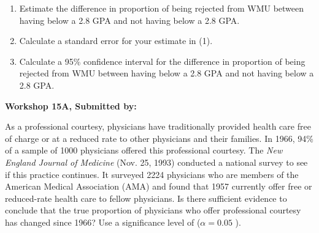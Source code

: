 \documentclass[11pt, chapterprefix=true]{scrbook}\usepackage[]{graphicx}\usepackage[]{color}
\begin{document}
\begin{exercises}
\begin{exercise}
\begin{enumerate}
  \item Estimate the difference in proportion of being rejected from WMU between having below a 2.8 GPA and not having below a 2.8 GPA.
  \item Calculate a standard error for your estimate in (1).  
  \item Calculate a 95\% confidence interval for the difference in proportion of being rejected from WMU between having below a 2.8 GPA and not having below a 2.8 GPA.
\end{enumerate}

\end{exercise} 
\begin{solution}  %

\end{solution}

\clearpage

    \begin{exercise}  %

    \begin{center}
\begin{flushleft}\textbf{\large \hfill Workshop 15A, Submitted by: }\end{flushleft}

\end{center}


As a professional courtesy, physicians have traditionally provided health care free of charge or at a reduced rate to other physicians and their families. In 1966, 94\% of a sample of 1000 physicians offered this professional courtesy. The \textit{New England Journal of Medicine} (Nov. 25, 1993) conducted a national survey to see if this practice continues. It surveyed 2224 physicians who are members of the American Medical Association (AMA) and found that 1957 currently offer free or reduced-rate health care to fellow physicians. Is there sufficient evidence to conclude that the true proportion of physicians who offer professional courtesy has changed since 1966? Use a significance level of ($\alpha = 0.05$ ).


\end{exercise}
\end{exercises}
\end{document}
